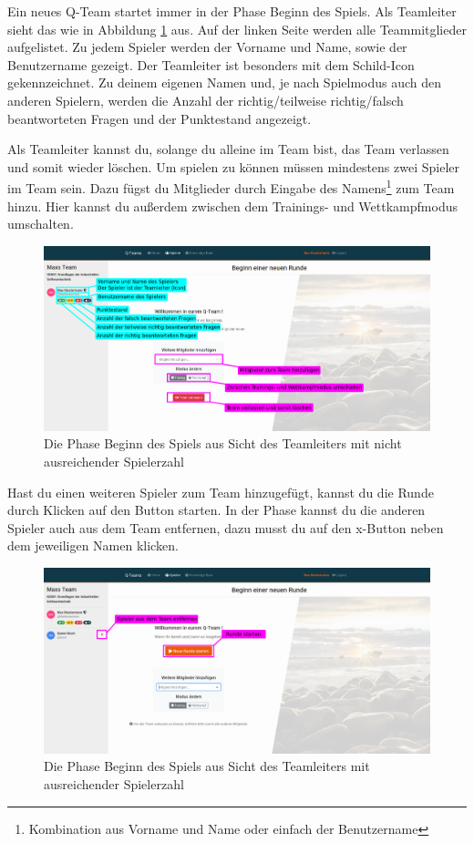 \documentclass[a4paper,11pt,listof=numbered,glossary=totoc,parskip=half,toc=bib]{scrreprt}
\begin{document}
\begin{appendices}
	Ein neues Q-Team startet immer in der Phase Beginn des Spiels. Als Teamleiter sieht das wie in Abbildung \ref{fig:guide_beginn_nichtbereit} aus. Auf der linken Seite werden alle Teammitglieder aufgelistet. Zu jedem Spieler werden der Vorname und Name, sowie der Benutzername gezeigt. Der Teamleiter ist besonders mit dem Schild-Icon gekennzeichnet. Zu deinem eigenen Namen und, je nach Spielmodus auch den anderen Spielern, werden die Anzahl der richtig/teilweise richtig/falsch beantworteten Fragen und der Punktestand angezeigt.
	
	Als Teamleiter kannst du, solange du alleine im Team bist, das Team verlassen und somit wieder löschen. Um spielen zu können müssen mindestens zwei Spieler im Team sein. Dazu fügst du Mitglieder durch Eingabe des Namens\footnote{Kombination aus Vorname und Name oder einfach der Benutzername} zum Team hinzu. Hier kannst du außerdem zwischen dem Trainings- und Wettkampfmodus umschalten.
	
	\begin{figure}[h!]
		\centering
		\includegraphics[width=\textwidth]{UserGuide/Rundenbeginn_Leiter.png}
		\caption{Die Phase Beginn des Spiels aus Sicht des Teamleiters mit nicht ausreichender Spielerzahl}
		\label{fig:guide_beginn_nichtbereit}
	\end{figure}
	
	Hast du einen weiteren Spieler zum Team hinzugefügt, kannst du die Runde durch Klicken auf den Button starten. In der Phase kannst du die anderen Spieler auch aus dem Team entfernen, dazu musst du auf den x-Button neben dem jeweiligen Namen klicken.
	
	\begin{figure}[h!]
		\centering
		\includegraphics[width=\textwidth]{UserGuide/Rundenbeginn_Leiter_2.png}
		\caption{Die Phase Beginn des Spiels aus Sicht des Teamleiters mit ausreichender Spielerzahl}
		\label{fig:guide_beginn_bereit}
	\end{figure}
	

\end{appendices}
\end{document}
